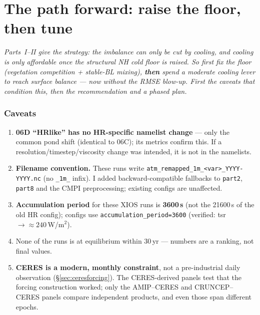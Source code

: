 \documentclass[10pt]{article}
\begin{document}
\part{The path forward: raise the floor, then tune}
\emph{Parts~I--II give the strategy: the imbalance can only be cut by cooling, and cooling is only affordable once the
structural NH cold floor is raised. So first fix the floor (vegetation competition + stable-BL mixing), \textbf{then}
spend a moderate cooling lever to reach surface balance --- now without the RMSE blow-up. First the caveats that
condition this, then the recommendation and a phased plan.}

\section{Caveats}\label{sec:caveats}
\begin{enumerate}\itemsep1pt
\item \textbf{06D ``HRlike'' has no HR-specific namelist change} --- only the common pond shift (identical to 06C);
its metrics confirm this. If a resolution/timestep/viscosity change was intended, it is not in the namelists.
\item \textbf{Filename convention.} These runs write \texttt{atm\_remapped\_1m\_<var>\_YYYY-YYYY.nc} (no
\texttt{\_1m\_} infix). I added backward-compatible fallbacks to \texttt{part2}, \texttt{part8} and the CMPI
preprocessing; existing configs are unaffected.
\item \textbf{Accumulation period} for these XIOS runs is \textbf{3600\,s} (not the 21600\,s of the old HR config);
configs use \texttt{accumulation\_period=3600} (verified: tsr\,$\to\approx240$\,W/m$^2$).
\item None of the runs is at equilibrium within 30\,yr --- numbers are a ranking, not final values.
\item \textbf{CERES is a modern, monthly constraint}, not a pre-industrial daily observation
(\S\ref{sec:ceresforcing}). The CERES-derived panels test that the forcing construction worked; only the
AMIP--CERES and CRUNCEP--CERES panels compare independent products, and even those span different epochs.
\end{enumerate}
\end{document}
